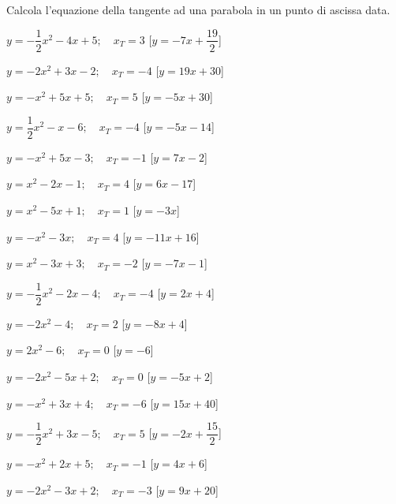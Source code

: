 \subsubsection*{}

\begin{esercizio}\label{ese:}
 Calcola l'equazione della tangente ad una parabola in un punto di ascissa 
data.
 \begin{enumeratea}
  \item  $y=-\dfrac{1}{2} x^2 -4 x +5; \quad x_T=3$
   \hfill [$y = -7 x +\dfrac{19}{2}$]
  \item  $y=-2 x^2 +3 x -2; \quad x_T=-4$
   \hfill [$y = 19 x +30$]
  \item  $y=- x^2 +5 x +5; \quad x_T=5$
   \hfill [$y = -5 x +30$]
  \item  $y=\dfrac{1}{2} x^2 - x -6; \quad x_T=-4$
   \hfill [$y = -5 x -14$]
  \item  $y=- x^2 +5 x -3; \quad x_T=-1$
   \hfill [$y = 7 x -2$]
  \item  $y=x^2 -2 x -1; \quad x_T=4$
   \hfill [$y = 6 x -17$]
  \item  $y=x^2 -5 x +1; \quad x_T=1$
   \hfill [$y = -3 x $]
  \item  $y=- x^2 -3 x ; \quad x_T=4$
   \hfill [$y = -11 x +16$]
  \item  $y=x^2 -3 x +3; \quad x_T=-2$
   \hfill [$y = -7 x -1$]
  \item  $y=-\dfrac{1}{2} x^2 -2 x -4; \quad x_T=-4$
   \hfill [$y = 2 x +4$]
  \item  $y=-2 x^2 -4; \quad x_T=2$
   \hfill [$y = -8 x +4$]
  \item  $y=2 x^2 -6; \quad x_T=0$
   \hfill [$y = -6$]
  \item  $y=-2 x^2 -5 x +2; \quad x_T=0$
   \hfill [$y = -5 x +2$]
  \item  $y=- x^2 +3 x +4; \quad x_T=-6$
   \hfill [$y = 15 x +40$]
  \item  $y=-\dfrac{1}{2} x^2 +3 x -5; \quad x_T=5$
   \hfill [$y = -2 x +\dfrac{15}{2}$]
  \item  $y=- x^2 +2 x +5; \quad x_T=-1$
   \hfill [$y = 4 x +6$]
  \item  $y=-2 x^2 -3 x +2; \quad x_T=-3$
   \hfill [$y = 9 x +20$]

\end{enumeratea}
\end{esercizio}
